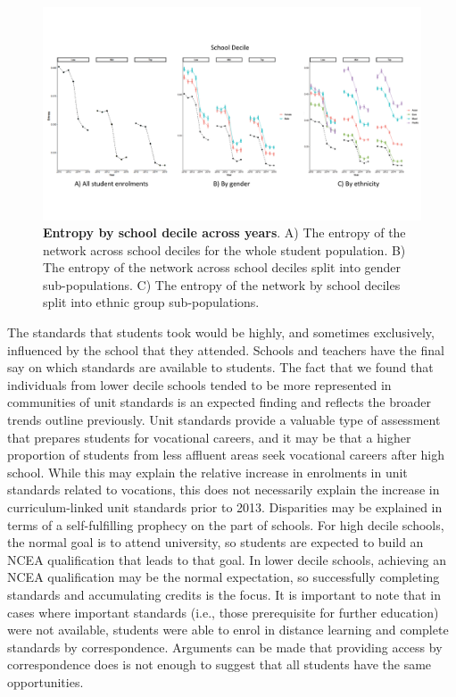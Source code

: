 \begin{figure}[h]
    \centering
    \includegraphics[width = \textwidth]{C2 - Student Pathways/Entropy_Decile.pdf}
    \caption{\textbf{Entropy by school decile across years}. A) The entropy of the network across school deciles for the whole student population. B) The entropy of the network across school deciles split into gender sub-populations. C) The entropy of the network by school deciles split into ethnic group sub-populations. 
    }
    
    \label{fig:Entropy_Decile}
\end{figure}


The standards that students took would be highly, and sometimes exclusively, influenced by the school that they attended. Schools and teachers have the final say on which standards are available to students. The fact that we found that individuals from lower decile schools tended to be more represented in communities of unit standards is an expected finding and reflects the broader trends outline previously. Unit standards provide a valuable type of assessment that prepares students for vocational careers, and it may be that a higher proportion of students from less affluent areas seek vocational careers after high school. While this may explain the relative increase in enrolments in unit standards related to vocations, this does not necessarily explain the increase in curriculum-linked unit standards prior to 2013. Disparities may be explained in terms of a self-fulfilling prophecy on the part of schools. For high decile schools, the normal goal is to attend university, so students are expected to build an NCEA qualification that leads to that goal. In lower decile schools, achieving an NCEA qualification may be the normal expectation, so successfully completing standards and accumulating credits is the focus. It is important to note that in cases where important standards (i.e., those prerequisite for further education) were not available, students were able to enrol in distance learning and complete standards by correspondence. Arguments can be made that providing access by correspondence does is not enough to suggest that all students have the same opportunities. 


